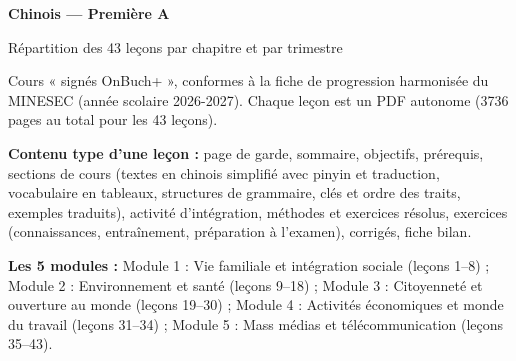 \documentclass[11pt,a4paper]{article}
\begin{document}
{\LARGE\bfseries Chinois — Première A\par}\smallskip
{\large Répartition des 43 leçons par chapitre et par trimestre\par}\medskip
Cours « signés OnBuch+ », conformes à la fiche de progression harmonisée du MINESEC (année scolaire 2026-2027). Chaque leçon est un PDF autonome (3736 pages au total pour les 43 leçons).\par\medskip
\textbf{Contenu type d'une leçon :} page de garde, sommaire, objectifs, prérequis, sections de cours (textes en chinois simplifié avec pinyin et traduction, vocabulaire en tableaux, structures de grammaire, clés et ordre des traits, exemples traduits), activité d'intégration, méthodes et exercices résolus, exercices (connaissances, entraînement, préparation à l'examen), corrigés, fiche bilan.\par\medskip
\textbf{Les 5 modules :} Module 1 : Vie familiale et intégration sociale (leçons 1--8) ; Module 2 : Environnement et santé (leçons 9--18) ; Module 3 : Citoyenneté et ouverture au monde (leçons 19--30) ; Module 4 : Activités économiques et monde du travail (leçons 31--34) ; Module 5 : Mass médias et télécommunication (leçons 35--43).\par\bigskip
\end{document}
